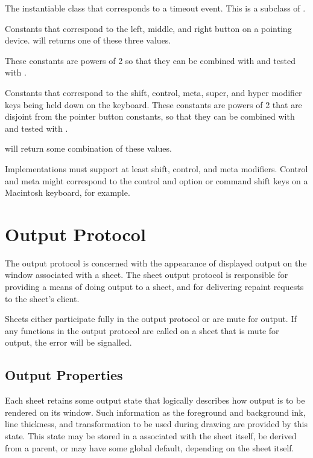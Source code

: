 
The instantiable class that corresponds to a timeout event.  This is a subclass
of .



Constants that correspond to the left, middle, and right button on a pointing
device.   will returns one of these three values.

These constants are powers of 2 so that they can be combined with 
and tested with .


Constants that correspond to the shift, control, meta, super, and hyper modifier
keys being held down on the keyboard.  These constants are powers of 2 that are
disjoint from the pointer button constants, so that they can be combined with
 and tested with .

 will return some combination of these values.

Implementations must support at least shift, control, and meta modifiers.
Control and meta might correspond to the control and option or command shift
keys on a Macintosh keyboard, for example.


\section {Output Protocol}

The output protocol is concerned with the appearance of displayed output on the
window associated with a sheet.  The sheet output protocol is responsible for
providing a means of doing output to a sheet, and for delivering repaint
requests to the sheet's client.

Sheets either participate fully in the output protocol or are mute for output.
If any functions in the output protocol are called on a sheet that is mute for
output, the  error will be signalled.


\subsection {Output Properties}

Each sheet retains some output state that logically describes how output is to
be rendered on its window.  Such information as the foreground and background
ink, line thickness, and transformation to be used during drawing are provided
by this state.  This state may be stored in a  associated with
the sheet itself, be derived from a parent, or may have some global default,
depending on the sheet itself.

